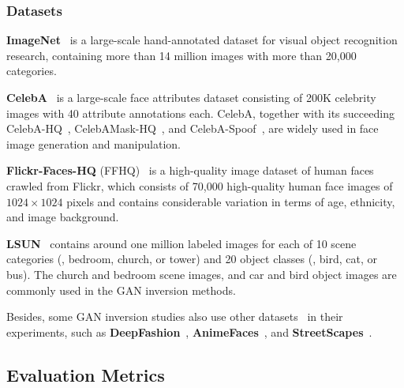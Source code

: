 \subsubsection{Datasets}
\label{sec:datasets}

\vspace{1mm}
\noindent\textbf{ImageNet}~\cite{russakovsky2015imagenet} is a large-scale hand-annotated dataset for visual object recognition research, containing more than 14 million images with more than 20,000 categories.\par

\vspace{1mm}
\noindent\textbf{CelebA}~\cite{liu2015faceattributes} is a large-scale face attributes dataset consisting of 200K celebrity images with 40 attribute annotations each. CelebA, together with its succeeding CelebA-HQ~\cite{karras2017progressive}, CelebAMask-HQ~\cite{CelebAMask-HQ}, and CelebA-Spoof~\cite{CelebA-Spoof}, are widely used in face image generation and manipulation.\par

\vspace{1mm}
\noindent\textbf{Flickr-Faces-HQ} (FFHQ)~\cite{karras2019style,karras2020analyzing} is a high-quality image dataset of human faces crawled from Flickr, which consists of 70,000 high-quality human face images of $1024 \times 1024$ pixels and contains considerable variation in terms of age, ethnicity, and image background.\par

\vspace{1mm}
\noindent\textbf{LSUN}~\cite{yu2015lsun} contains around one million labeled images for each of 10 scene categories (\eg, bedroom, church, or tower) and 20 object classes (\eg, bird, cat, or bus).
The church and bedroom scene images, and car and bird object images are commonly used in the GAN inversion methods.\par

Besides, some GAN inversion studies also use other datasets~\cite{lecun1998mnist,xiao2017fashion,krizhevsky2009learning,chen2014cross,yu2017jittor,xia2020tedigan} in their experiments, such as \textbf{DeepFashion}~\cite{liu2016fashion, liu2016deepfashion, Ge2019DeepFashion2}, \textbf{AnimeFaces}~\cite{jin2017towards}, and \textbf{StreetScapes}~\cite{naik2014streetscore}.

\subsection{Evaluation Metrics}
\label{sec:metrics}

